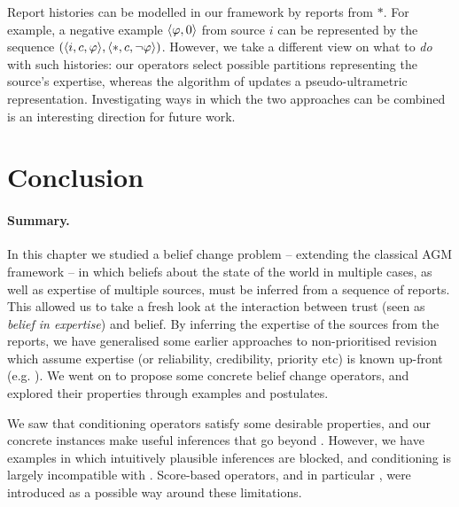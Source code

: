Report histories can be modelled in our framework by reports from $\ast$. For
example, a negative example $\langle {\varphi, 0} \rangle$ from source $i$ can be
represented by the sequence $(\langle {i, c, \varphi} \rangle, \langle {\ast, c, \neg\varphi} \rangle)$.
However, we take a different view on what to \emph{do} with such histories: our
operators select possible partitions representing the source's expertise,
whereas the algorithm of \textcite{hunter_building_21} updates a
pseudo-ultrametric representation. Investigating ways in which the two
approaches can be combined is an interesting direction for future work.

\section{Conclusion}
\label{kr_sec_conclusion}

\paragraph{Summary.} In this chapter we studied a belief change problem --
extending the classical AGM framework -- in which
beliefs about the state of the world in multiple cases, as well as expertise of
multiple sources, must be inferred from a sequence of reports. This allowed us
to take a fresh look at the
interaction between trust (seen as \emph{belief in expertise}) and belief.
By inferring the expertise of the sources from the reports,
we have generalised some earlier approaches to non-prioritised
revision which assume expertise (or reliability, credibility, priority
etc) is known up-front (e.g.
\cite{ferme1999selective,hansson_2001,booth_trust_2018,delgrande2006iterated}).
We went on to propose some concrete belief change operators, and explored their
properties through examples and postulates.

We saw that conditioning operators satisfy some desirable
properties, and our concrete instances make useful inferences that go
beyond \weakop{}. However, we have examples in which intuitively plausible
inferences are blocked, and conditioning is largely incompatible with
\strongcondsucc{}. Score-based operators, and in particular \scorebasedop{},
were introduced as a possible way around these limitations.

